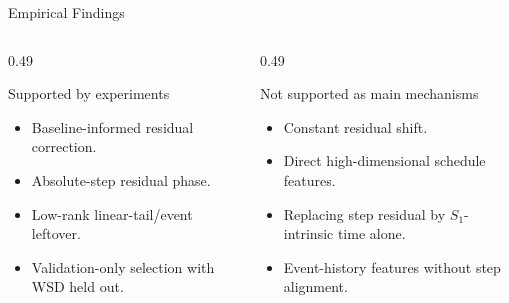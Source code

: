 \documentclass[fontset=fandol,aspectratio=169,10pt]{ctexbeamer}
\begin{document}
\begin{frame}{Empirical Findings}
  \begin{columns}[T,onlytextwidth]
    \begin{column}{0.49\textwidth}
      \begin{block}{Supported by experiments}
        \begin{itemize}
          \item Baseline-informed residual correction.
          \item Absolute-step residual phase.
          \item Low-rank linear-tail/event leftover.
          \item Validation-only selection with WSD held out.
        \end{itemize}
      \end{block}
    \end{column}
    \begin{column}{0.49\textwidth}
      \begin{block}{Not supported as main mechanisms}
        \begin{itemize}
          \item Constant residual shift.
          \item Direct high-dimensional schedule features.
          \item Replacing step residual by \(S_1\)-intrinsic time alone.
          \item Event-history features without step alignment.
        \end{itemize}
      \end{block}
    \end{column}
  \end{columns}
\end{frame}
\end{document}
